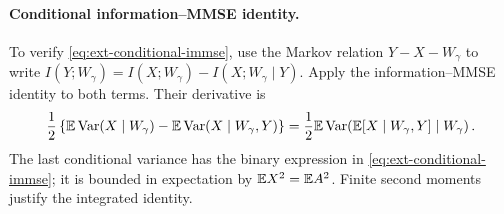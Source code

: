 \paragraph{Conditional information--MMSE identity.}
To verify \eqref{eq:ext-conditional-immse}, use the Markov relation
$Y\mathbin{-}X\mathbin{-}W_\gamma$ to write
$I(Y;W_\gamma)=I(X;W_\gamma)-I(X;W_\gamma\mid Y)$.
Apply the information--MMSE identity to both terms. Their derivative is
\[
 \frac12\left\{\mathbb E\operatorname{Var}(X\mid W_\gamma)
       -\mathbb E\operatorname{Var}(X\mid W_\gamma,Y)\right\}
 =\frac12\mathbb E\operatorname{Var}\!\left(\mathbb E[X\mid W_\gamma,Y]\mid W_\gamma\right).
\]
The last conditional variance has the binary expression in
\eqref{eq:ext-conditional-immse}; it is bounded in expectation by
$\mathbb E X^2=\mathbb E A^2$. Finite second moments justify the integrated identity.

